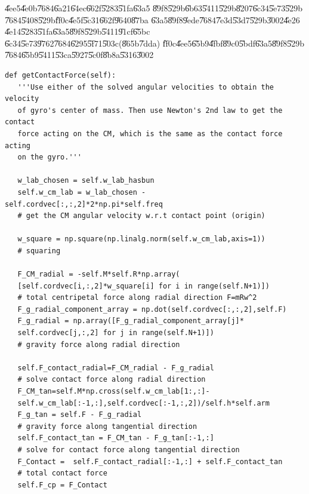 \bigskip

\U{4ee5}\U{4e0b}\U{7684}\U{6a21}\U{64ec}\U{662f}\U{5283}\U{51fa}\U{63a5}%
\U{89f8}\U{529b}\U{6b63}\U{5411}\U{529b}\U{8207}\U{6c34}\U{5e73}\U{529b}%
\U{7684}\U{5408}\U{529b}\U{ff0c}\U{4e5f}\U{5c31}\U{662f}\U{9640}\U{87ba}%
\U{63a5}\U{89f8}\U{9ede}\U{7684}\U{7e3d}\U{53d7}\U{529b}\U{3002}\U{4e26}%
\U{4e14}\U{5283}\U{51fa}\U{63a5}\U{89f8}\U{529b}\U{5411}\U{91cf}\U{65bc}%
\U{6c34}\U{5e73}\U{9762}\U{7684}\U{6295}\U{5f71}\U{503c}(\U{865b}\U{7dda})%
\U{ff0c}\U{4ee5}\U{65b9}\U{4fbf}\U{89c0}\U{5bdf}\U{63a5}\U{89f8}\U{529b}%
\U{7684}\U{65b9}\U{5411}\U{53ca}\U{5927}\U{5c0f}\U{8b8a}\U{5316}\U{3002}

\bigskip

\begin{verbatim} 
def getContactForce(self):
   '''Use either of the solved angular velocities to obtain the velocity 
   of gyro's center of mass. Then use Newton's 2nd law to get the contact 
   force acting on the CM, which is the same as the contact force acting 
   on the gyro.'''

   w_lab_chosen = self.w_lab_hasbun
   self.w_cm_lab = w_lab_chosen - self.cordvec[:,:,2]*2*np.pi*self.freq
   # get the CM angular velocity w.r.t contact point (origin)
   
   w_square = np.square(np.linalg.norm(self.w_cm_lab,axis=1))
   # squaring
   
   F_CM_radial = -self.M*self.R*np.array(
   [self.cordvec[i,:,2]*w_square[i] for i in range(self.N+1)])
   # total centripetal force along radial direction F=mRw^2
   F_g_radial_component_array = np.dot(self.cordvec[:,:,2],self.F)
   F_g_radial = np.array([F_g_radial_component_array[j]*
   self.cordvec[j,:,2] for j in range(self.N+1)])
   # gravity force along radial direction 

   self.F_contact_radial=F_CM_radial - F_g_radial 
   # solve contact force along radial direction
   F_CM_tan=self.M*np.cross(self.w_cm_lab[1:,:]-
   self.w_cm_lab[:-1,:],self.cordvec[:-1,:,2])/self.h*self.arm
   F_g_tan = self.F - F_g_radial
   # gravity force along tangential direction
   self.F_contact_tan = F_CM_tan - F_g_tan[:-1,:]
   # solve for contact force along tangential direction
   F_Contact =  self.F_contact_radial[:-1,:] + self.F_contact_tan
   # total contact force
   self.F_cp = F_Contact
\end{verbatim}

\clearpage%

